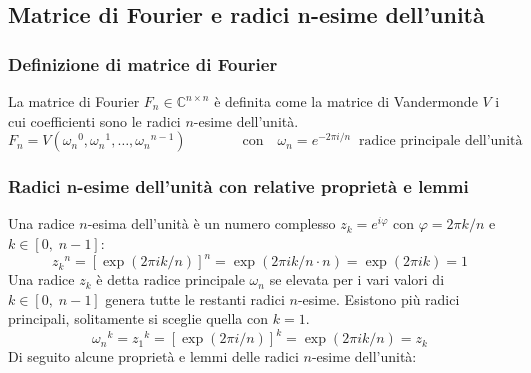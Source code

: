 \subsection{Matrice di Fourier e radici n-esime dell'unità}
\subsubsection*{Definizione di matrice di Fourier}
La matrice di Fourier \(F_n \in \mathbb{C}^{n \times n}\) è definita come la matrice di Vandermonde \(V\) i cui coefficienti
sono le radici \(n\)-esime dell'unità.
\[F_n = V\! \left( {\omega_n\!}^0, {\omega_n\!}^1, \dots, {\omega_n\!}^{n-1} \right) \qquad\qquad \text{con} \quad \omega_n = e^{-2\pi i / n} \;\; \text{radice principale dell'unità}\]

\subsubsection*{Radici n-esime dell'unità con relative proprietà e lemmi}
Una radice \(n\)-esima dell'unità è un numero complesso \(z_k = e^{i \varphi}\) con \(\varphi = 2\pi k/n\) e \(k \in [0, \; n\!-\!1]\):
\[{z_k}^n = [\exp (2 \pi i k / n)]^n = \exp (2 \pi i k / n \cdot n) = \exp (2 \pi i k) = 1\]
Una radice \(z_k\) è detta radice principale \(\omega_n\) se elevata per i vari valori di \(k \in [0, \; n\!-\!1]\)
genera tutte le restanti radici \(n\)-esime. Esistono più radici principali, solitamente si sceglie quella con \(k = 1\).
\[{\omega_n\!}^k = {z_1\!}^k = [\exp (2 \pi i / n)]^k = \exp (2 \pi i k / n) = z_k\]
Di seguito alcune proprietà e lemmi delle radici \(n\)-esime dell'unità:
